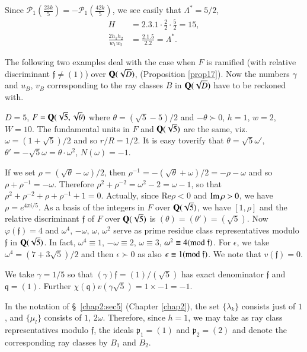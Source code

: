 Since
$\mathscr{P}_{1}\left(\frac{23k}{5}\right)=-\mathscr{P}_{1}\left(\frac{42k}{5}\right)$,
we see easily that $\Lambda^{\ast}=5/2$,
\begin{align*}
H &= 2.3.1\cdot \frac{2}{2}\cdot \frac{5}{2}=15,\\
\frac{2h_{1}h_{2}}{w_{1}w_{2}} &= \frac{2.1.5}{2.2}=\Lambda^{\ast}.
\end{align*}

The following two examples deal with the case when $F$ is ramified
(with relative discriminant $\mathfrak{f}\neq (1)$) over
$\mathbf{Q}(\sqrt{D})$, (\cf Proposition \ref{prop17}). Now the numbers
$\gamma$ and $u_{B}$, $v_{B}$ corresponding to the ray classes $B$ in
$\mathbf{Q}(\sqrt{D})$ have to be reckoned with.

\begin{exam}\label{exam7}
$D=5$, $F=\mathbf{Q}(\sqrt{5},\sqrt{\theta})$ where $\theta=(\sqrt{5}-5)/2$
  and $-\theta \succ 0$, $h=1$, $w=2$, $W=10$. The fundamental units in $F$
  and $\mathbf{Q}(\sqrt{5})$ are the same, viz.\@ $\omega=(1+\sqrt{5})/2$ and
  so $r/R=1/2$. It is easy to\pageoriginale verify that
  $\theta=\sqrt{5}\omega'$, $\theta'=-\sqrt{5}\omega=\theta\cdot
  \omega^{2}$, $N(\omega)=-1$.
\end{exam}

If we set $\rho=(\sqrt{\theta}-\omega)/2$, then
$\rho^{-1}=-(\sqrt{\theta}+\omega)/2=-\rho-\omega$ and so
$\rho+\rho^{-1}=-\omega$. Therefore
$\rho^{2}+\rho^{-2}=\omega^{2}-2=\omega-1$, so that
$\rho^{2}+\rho^{-2}+\rho+\rho^{-1}+1=0$. Actually, since $\text{Re
}\rho<0$ and $\operatorname{Im} \rho>0$, we have $\rho=e^{4\pi i/5}$. As a basis of
the integers in $F$ over $\mathbf{Q}(\sqrt{5})$, we have $[1,\rho]$ and the
relative discriminant $\mathfrak{f}$ of $F$ over $\mathbf{Q}(\sqrt{5})$ is
$(\theta)=(\theta')=(\sqrt{5})$. Now $\varphi(\mathfrak{f})=4$ and
$\omega^{4}$, $-\omega$, $\omega$, $\omega^{2}$ serve as prime residue
class representatives modulo $\mathfrak{f}$ in $\mathbf{Q}(\sqrt{5})$. In
fact, $\omega^{4}\equiv 1$, $-\omega\equiv 2$, $\omega\equiv 3$,
$\omega^{2}\equiv 4(\rm{mod} \;\mathfrak{f})$. For $\epsilon$, we take
$\omega^{4}=(7+3\sqrt{5})/2$ and then $\epsilon \succ 0$ as also
$\epsilon\equiv 1(\rm{mod} \;\mathfrak{f})$. We note that
$v(\mathfrak{f})=0$.

We take $\gamma=1/5$ so that $(\gamma)\mathfrak{f}=(1)/(\sqrt{5})$ has
exact denominator $\mathfrak{f}$ and $\mathfrak{q}=(1)$. Further
$\chi(\mathfrak{q})v(\gamma\sqrt{5})=1\times -1=-1$.

In the notation of \S\ \ref{chap2:sec5} (Chapter \ref{chap2}), the set
$\{\lambda_{k}\}$ 
consists just of $1$, and $\{\mu_{l}\}$ consists of $1$,
$2\omega$. Therefore, since $h=1$, we may take as ray class
representatives modulo $\mathfrak{f}$, the ideals
$\mathfrak{p}_{1}=(1)$ and $\mathfrak{p}_{2}=(2)$ and denote the
corresponding ray classes by $B_{1}$ and $B_{2}$.

